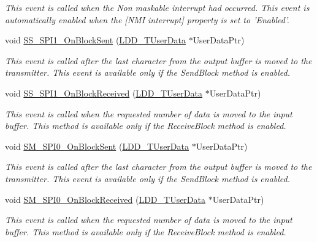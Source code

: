 \begin{DoxyCompactItemize}
\begin{DoxyCompactList}\small\item\em This event is called when the Non maskable interrupt had occurred. This event is automatically enabled when the \mbox{[}N\-M\-I interrupt\mbox{]} property is set to 'Enabled'. \end{DoxyCompactList}\item 
void \hyperlink{group___events__module_ga52e0cf25d8a4434745cf278f39e0a64c}{S\-S\-\_\-\-S\-P\-I1\-\_\-\-On\-Block\-Sent} (\hyperlink{group___p_e___types__module_ga0b66a73f87238a782318aa0be7578e35}{L\-D\-D\-\_\-\-T\-User\-Data} $\ast$User\-Data\-Ptr)
\begin{DoxyCompactList}\small\item\em This event is called after the last character from the output buffer is moved to the transmitter. This event is available only if the Send\-Block method is enabled. \end{DoxyCompactList}\item 
void \hyperlink{group___events__module_gab4ceb0c6a2bb862adca96870b7c9b12e}{S\-S\-\_\-\-S\-P\-I1\-\_\-\-On\-Block\-Received} (\hyperlink{group___p_e___types__module_ga0b66a73f87238a782318aa0be7578e35}{L\-D\-D\-\_\-\-T\-User\-Data} $\ast$User\-Data\-Ptr)
\begin{DoxyCompactList}\small\item\em This event is called when the requested number of data is moved to the input buffer. This method is available only if the Receive\-Block method is enabled. \end{DoxyCompactList}\item 
void \hyperlink{group___events__module_ga72a1f9d4a6051ecc888818cca58f3fdb}{S\-M\-\_\-\-S\-P\-I0\-\_\-\-On\-Block\-Sent} (\hyperlink{group___p_e___types__module_ga0b66a73f87238a782318aa0be7578e35}{L\-D\-D\-\_\-\-T\-User\-Data} $\ast$User\-Data\-Ptr)
\begin{DoxyCompactList}\small\item\em This event is called after the last character from the output buffer is moved to the transmitter. This event is available only if the Send\-Block method is enabled. \end{DoxyCompactList}\item 
void \hyperlink{group___events__module_ga8b79c4a95ebfccf4a54c88d8a780d92f}{S\-M\-\_\-\-S\-P\-I0\-\_\-\-On\-Block\-Received} (\hyperlink{group___p_e___types__module_ga0b66a73f87238a782318aa0be7578e35}{L\-D\-D\-\_\-\-T\-User\-Data} $\ast$User\-Data\-Ptr)
\begin{DoxyCompactList}\small\item\em This event is called when the requested number of data is moved to the input buffer. This method is available only if the Receive\-Block method is enabled. \end{DoxyCompactList}\item 

\end{DoxyCompactItemize}
